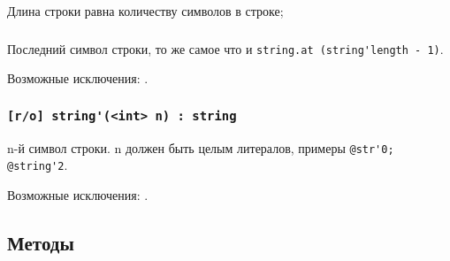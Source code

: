 Длина строки равна количеству символов в строке;

\subsubsection{}

Последний символ строки, то же самое что и \lstinline|string.at (string'length - 1)|.

Возможные исключения: .

\subsubsection{\lstinline|[r/o] string'(<int> n) : string|}

n-й символ строки. n должен быть целым литералов, примеры \lstinline|@str'0; @string'2|.

Возможные исключения: .

\subsection{Методы}

